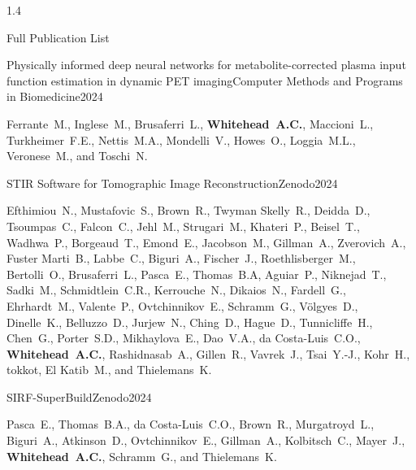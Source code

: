 \documentclass{cv}
\begin{document}
\begin{spacing}{1.4}
\begin{rSection}{Full Publication List}
            \vspace{-0.5cm}
            \item \begin{rSubsection}{Physically informed deep neural networks for metabolite-corrected plasma input function estimation in dynamic PET imaging}{}{Computer Methods and Programs in Biomedicine}{2024}
                \vspace{-0.25cm}
                \item Ferrante~M., Inglese~M., Brusaferri~L., \textbf{Whitehead~A.C.}, Maccioni~L., Turkheimer~F.E., Nettis~M.A., Mondelli~V., Howes~O., Loggia~M.L., Veronese~M., and Toschi~N.
            \end{rSubsection}
    
            \vspace{-0.5cm}
            \item \begin{rSubsection}{STIR Software for Tomographic Image Reconstruction}{}{Zenodo}{2024}
                \vspace{-0.25cm}
                \item Efthimiou~N., Mustafovic~S., Brown~R., Twyman Skelly~R., Deidda~D., Tsoumpas~C., Falcon~C., Jehl~M., Strugari~M., Khateri~P., Beisel~T., Wadhwa~P., Borgeaud~T., Emond~E., Jacobson~M., Gillman~A., Zverovich~A., Fuster Marti~B., Labbe~C., Biguri~A., Fischer~J., Roethlisberger~M., Bertolli~O., Brusaferri~L., Pasca~E., Thomas~B.A, Aguiar~P., Niknejad~T., Sadki~M., Schmidtlein~C.R., Kerrouche~N., Dikaios~N., Fardell~G., Ehrhardt~M., Valente~P., Ovtchinnikov~E., Schramm~G., Völgyes~D., Dinelle~K., Belluzzo~D., Jurjew~N., Ching~D., Hague~D., Tunnicliffe~H., Chen~G., Porter~S.D., Mikhaylova~E., Dao~V.A., da Costa-Luis~C.O., \textbf{Whitehead~A.C.}, Rashidnasab~A., Gillen~R., Vavrek~J., Tsai~Y.-J., Kohr~H., tokkot, El Katib~M., and Thielemans~K.
            \end{rSubsection}
    
            \vspace{-0.5cm}
            \item \begin{rSubsection}{SIRF-SuperBuild}{}{Zenodo}{2024}
                \vspace{-0.25cm}
                \item Pasca~E., Thomas~B.A., da Costa-Luis~C.O., Brown~R., Murgatroyd~L., Biguri~A., Atkinson~D., Ovtchinnikov~E., Gillman~A., Kolbitsch~C., Mayer~J., \textbf{Whitehead~A.C.}, Schramm~G., and Thielemans~K.
            \end{rSubsection}
    

\end{rSection}
\end{spacing}
\end{document}
